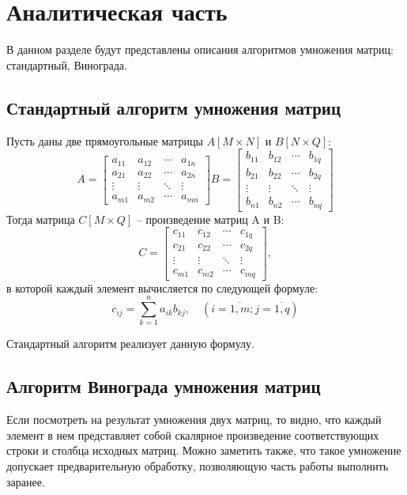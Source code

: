 \chapter{Аналитическая часть}
В данном разделе будут представлены описания алгоритмов умножения матриц: стандартный, Винограда.

\section{Стандартный алгоритм умножения матриц}

Пусть даны две прямоугольные матрицы $A[M \times N]$ и $B[N \times Q]$:
$$
A = 
\begin{bmatrix} 
	a_{11} & a_{12} & \cdots & a_{1n} \\
	a_{21} & a_{22} & \cdots & a_{2n} \\ 
	\vdots & \vdots & \ddots & \vdots \\ 
	a_{m1} & a_{m2} & \cdots & a_{mn}
\end{bmatrix}
B =   
\begin{bmatrix} 
	b_{11} & b_{12} & \cdots & b_{1q} \\
	b_{21} & b_{22} & \cdots & b_{2q} \\ 
	\vdots & \vdots & \ddots & \vdots \\ 
	b_{n1} & b_{n2} & \cdots & b_{nq}
\end{bmatrix}
$$
Тогда матрица $C[M \times Q]$ -- произведение матриц A и B:
$$
C = 
\begin{bmatrix} 
	c_{11} & c_{12} & \cdots & c_{1q} \\
	c_{21} & c_{22} & \cdots & c_{2q} \\ 
	\vdots & \vdots & \ddots & \vdots \\ 
	c_{m1} & c_{m2} & \cdots & c_{mq}
\end{bmatrix},
$$
в которой каждый элемент вычисляется по следующей формуле: 
\begin{equation}
	\label{eq:N}
	c_{ij} =
	\sum_{k=1}^{n} a_{ik}b_{kj}, \quad (i=\overline{1,m}; j=\overline{1,q})
\end{equation}

Стандартный алгоритм реализует данную формулу.


\section{Алгоритм Винограда умножения матриц}
Если посмотреть на результат умножения двух матриц, то видно, что каждый элемент в нем представляет собой скалярное произведение соответствующих строки и столбца исходных матриц.
Можно заметить также, что такое умножение допускает предварительную обработку, позволяющую часть работы выполнить заранее.

